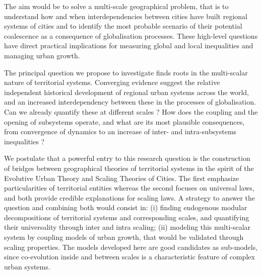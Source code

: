 



The aim would be to solve a multi-scale geographical problem, that is to understand how and when interdependencies between cities have built regional systems of cities and to identify the most probable scenario of their potential coalescence as a consequence of globalisation processes. These high-level questions have direct practical implications for measuring global and local inequalities and managing urban growth.


The principal question we propose to investigate finds roots in the multi-scalar nature of territorial systems. Converging evidence suggest the relative independent historical development of regional urban systems across the world, and an increased interdependency between these in the processes of globalisation. Can we already quantify these at different scales ? How does the coupling and the opening of subsystems operate, and what are its most plausible consequences, from convergence of dynamics to an increase of inter- and intra-subsystems inequalities ?

We postulate that a powerful entry to this research question is the construction of bridges between geographical theories of territorial systems in the spirit of the Evolutive Urban Theory and Scaling Theories of Cities. The first emphasize particularities of territorial entities whereas the second focuses on universal laws, and both provide credible explanations for scaling laws. A strategy to answer the question and combining both would consist in: (i) finding endogenous modular decompositions of territorial systems and corresponding scales, and quantifying their universality through inter and intra scaling; (ii) modeling this multi-scalar system by coupling models of urban growth, that would be validated through scaling properties. The models developed here are good candidates as sub-models, since co-evolution inside and between scales is a characteristic feature of complex urban systems.



















